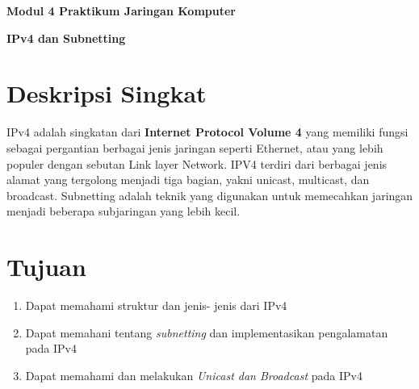 \documentclass{article}
\begin{document}
    \begin{center}
        \textbf{Modul 4 Praktikum Jaringan Komputer}

        \textbf{IPv4 dan Subnetting}
    \end{center}

    \section*{Deskripsi Singkat}
    IPv4 adalah singkatan dari \textbf{Internet Protocol Volume 4} yang memiliki fungsi sebagai pergantian berbagai jenis jaringan seperti Ethernet, atau yang lebih populer dengan sebutan Link layer Network.
    IPV4 terdiri dari berbagai jenis alamat yang tergolong menjadi tiga bagian, yakni unicast, multicast, dan broadcast. 
    Subnetting adalah teknik yang digunakan untuk memecahkan jaringan menjadi beberapa subjaringan yang lebih kecil.

    \section*{Tujuan}
    \begin{enumerate}
        \item Dapat memahami struktur dan jenis- jenis dari IPv4
        \item Dapat memahani tentang \textit{subnetting} dan implementasikan pengalamatan pada IPv4
        \item Dapat memahami dan melakukan \textit{Unicast dan Broadcast} pada IPv4 
    \end{enumerate}
\end{document}
